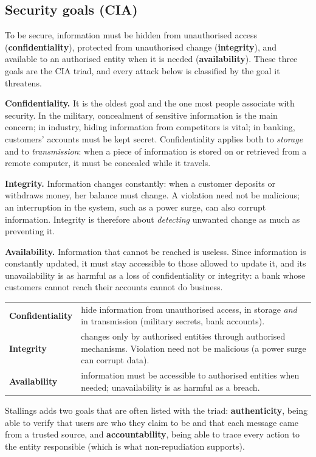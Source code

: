 \subsection{Security goals (CIA)}
To be secure, information must be hidden from unauthorised access (\textbf{confidentiality}), protected from unauthorised change (\textbf{integrity}), and available to an authorised entity when it is needed (\textbf{availability}). These three goals are the CIA triad, and every attack below is classified by the goal it threatens.

\textbf{Confidentiality.}  It is the oldest goal and the one most people associate with security. In the military, concealment of sensitive information is the main concern; in industry, hiding information from competitors is vital; in banking, customers' accounts must be kept secret. Confidentiality applies both to \emph{storage} and to \emph{transmission}: when a piece of information is stored on or retrieved from a remote computer, it must be concealed while it travels.

\textbf{Integrity.} Information changes constantly: when a customer deposits or withdraws money, her balance must change.  A violation need not be malicious; an interruption in the system, such as a power surge, can also corrupt information. Integrity is therefore about \emph{detecting} unwanted change as much as preventing it.

\textbf{Availability.} Information that cannot be reached is useless.  Since information is constantly updated, it must stay accessible to those allowed to update it, and its unavailability is as harmful as a loss of confidentiality or integrity: a bank whose customers cannot reach their accounts cannot do business.
\begin{center}\small
\begin{tabularx}{\textwidth}{@{}l X@{}}
\toprule
\textbf{Confidentiality} & hide information from unauthorised access, in storage \emph{and} in transmission (military secrets, bank accounts).\\
\textbf{Integrity} & changes only by authorised entities through authorised mechanisms. Violation need not be malicious (a power surge can corrupt data).\\
\textbf{Availability} & information must be accessible to authorised entities when needed; unavailability is as harmful as a breach.\\
\bottomrule
\end{tabularx}
\end{center}
Stallings adds two goals that are often listed with the triad: \textbf{authenticity}, being able to verify that users are who they claim to be and that each message came from a trusted source, and \textbf{accountability}, being able to trace every action to the entity responsible (which is what non-repudiation supports).

